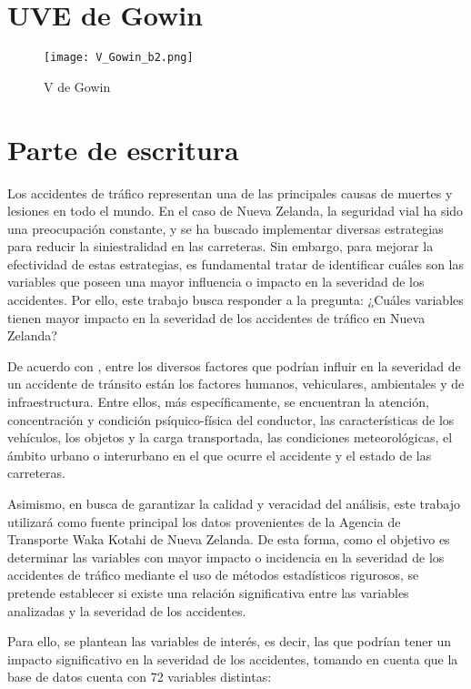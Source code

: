 \documentclass{book}
\begin{document}
\section{UVE de Gowin}

\begin{figure}[h]
\centering
\texttt{[image: V\_Gowin\_b2.png]}
\caption{\label{fig:Gowin}V de Gowin}
\end{figure}

\section{Parte de escritura}

Los accidentes de tráfico representan una de las principales causas de muertes y lesiones en todo el mundo. En el caso de Nueva Zelanda, la seguridad vial ha sido una preocupación constante, y se ha buscado implementar diversas estrategias para reducir la siniestralidad en las carreteras. Sin embargo, para mejorar la efectividad de estas estrategias, es fundamental tratar de identificar cuáles son las variables que poseen una mayor influencia o impacto en la severidad de los accidentes. Por ello, este trabajo busca responder a la pregunta: ¿Cuáles variables tienen mayor impacto en la severidad de los accidentes de tráfico en Nueva Zelanda?

De acuerdo con \cite{BuitragoRamírezFrancisco2019Vpdv}, entre los diversos factores que podrían influir en la severidad de un accidente de tránsito están los factores humanos, vehiculares, ambientales y de infraestructura. Entre ellos, más específicamente, se encuentran la atención, concentración y condición psíquico-física del conductor, las características de los vehículos, los objetos y la carga transportada, las condiciones meteorológicas, el ámbito urbano o interurbano en el que ocurre el accidente y el estado de las carreteras.

Asimismo, en busca de garantizar la calidad y veracidad del análisis, este trabajo utilizará como fuente principal los datos provenientes de la Agencia de Transporte Waka Kotahi de Nueva Zelanda. De esta forma, como el objetivo es determinar las variables con mayor impacto o incidencia en la severidad de los accidentes de tráfico mediante el uso de métodos estadísticos rigurosos, se pretende establecer si existe una relación significativa entre las variables analizadas y la severidad de los accidentes.

Para ello, se plantean las variables de interés, es decir, las que podrían tener un impacto significativo en la severidad de los accidentes, tomando en cuenta que la base de datos cuenta con 72 variables distintas:
\end{document}

